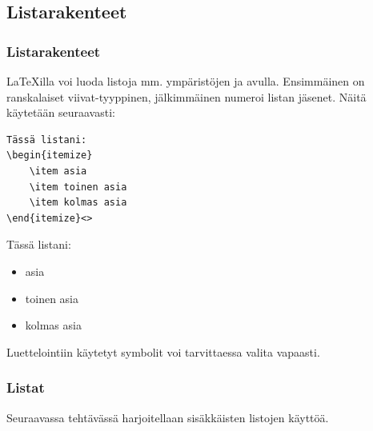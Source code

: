 \subsection{Listarakenteet}
\begin{frame}[fragile]
    \frametitle{Listarakenteet}
    \LaTeX illa voi luoda listoja mm. ympäristöjen  ja  avulla. Ensimmäinen on ranskalaiset viivat-tyyppinen, jälkimmäinen numeroi listan jäsenet. Näitä käytetään seuraavasti:
    \vaihto
    \begin{minipage}{5cm}
        \begin{lstlisting}
Tässä listani:
\begin{itemize}
    \item asia
    \item toinen asia
    \item kolmas asia
\end{itemize}<>
        \end{lstlisting}
    \end{minipage}
    \begin{minipage}{5cm}
        \begin{serif}
            Tässä listani:
            \begin{itemize}
                \item[\textcolor{black}{\textbullet}] asia
                \item[\textcolor{black}{\textbullet}] toinen asia
                \item[\textcolor{black}{\textbullet}] kolmas asia
            \end{itemize}
        \end{serif}
    \end{minipage}
    \vaihto
    Luettelointiin käytetyt symbolit voi tarvittaessa valita vapaasti. 
\end{frame}

\begin{frame}[fragile]
    \frametitle{Listat}
    Seuraavassa tehtävässä harjoitellaan sisäkkäisten listojen käyttöä.
    
    
\end{frame}


